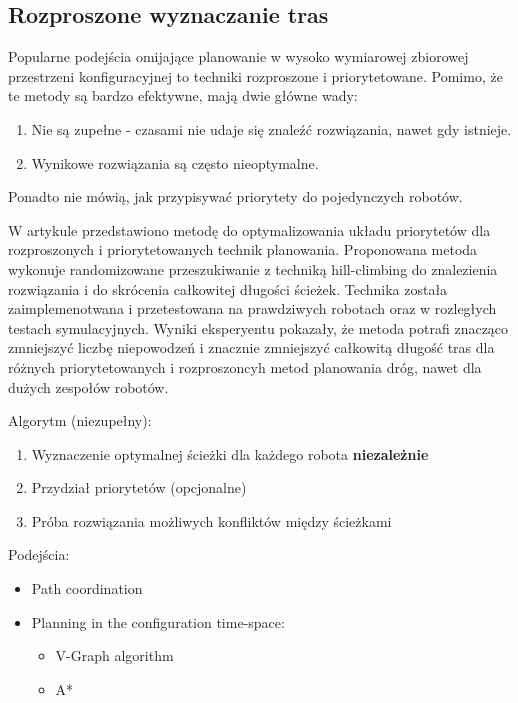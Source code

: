 \subsection{Rozproszone wyznaczanie tras}
Popularne podejścia omijające planowanie w wysoko wymiarowej zbiorowej przestrzeni konfiguracyjnej to techniki rozproszone i priorytetowane.
Pomimo, że te metody są bardzo efektywne, mają dwie główne wady:
\begin{enumerate}
	\item Nie są zupełne - czasami nie udaje się znaleźć rozwiązania, nawet gdy istnieje.
	\item Wynikowe rozwiązania są często nieoptymalne.
\end{enumerate}

Ponadto nie mówią, jak przypisywać priorytety do pojedynczych robotów.

W artykule \cite{optpriorities} przedstawiono metodę do optymalizowania układu priorytetów dla rozproszonych i priorytetowanych technik planowania.
Proponowana metoda wykonuje randomizowane przeszukiwanie z techniką hill-climbing do znalezienia rozwiązania i do skrócenia całkowitej długości ścieżek.
Technika została zaimplemenotwana i przetestowana na prawdziwych robotach oraz w rozległych testach symulacyjnych.
Wyniki eksperyentu pokazały, że metoda potrafi znacząco zmniejszyć liczbę niepowodzeń i znacznie zmniejszyć całkowitą długość tras dla różnych priorytetowanych i rozproszoncyh metod planowania dróg, nawet dla dużych zespołów robotów.

Algorytm (niezupełny):
\begin{enumerate}
	\item Wyznaczenie optymalnej ścieżki dla każdego robota {\bf niezależnie}
	\item Przydział priorytetów (opcjonalne)
	\item Próba rozwiązania możliwych konfliktów między ścieżkami
\end{enumerate}
Podejścia:
\begin{itemize}
	\item Path coordination
	\item Planning in the configuration time-space: %
		\begin{itemize}
			\item V-Graph algorithm
			\item A*
		\end{itemize}
\end{itemize}


